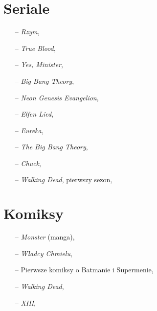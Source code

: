 \documentclass[a4paper,11pt]{article}
\begin{document}
\section{Seriale}


\begin{itemize}
\item[--] \textit{Rzym},

\item[--] \textit{True Blood},

\item[--] \textit{Yes, Minister},

\item[--] \textit{Big Bang Theory},

\item[--] \textit{Neon Genesis Evangelion},

\item[--] \textit{Elfen Lied},

\item[--] \textit{Eureka},

\item[--] \textit{The Big Bang Theory},

\item[--] \textit{Chuck},

\item[--] \textit{Walking Dead}, pierwszy sezon,

\end{itemize}










\section{Komiksy}


\begin{itemize}
\item[--] \textit{Monster} (manga),

\item[--] \textit{Władcy Chmielu},

\item[--] Pierwsze komiksy o Batmanie i Supermenie,

\item[--] \textit{Walking Dead},

\item[--] \textit{XIII},

\end{itemize}











\end{document}
